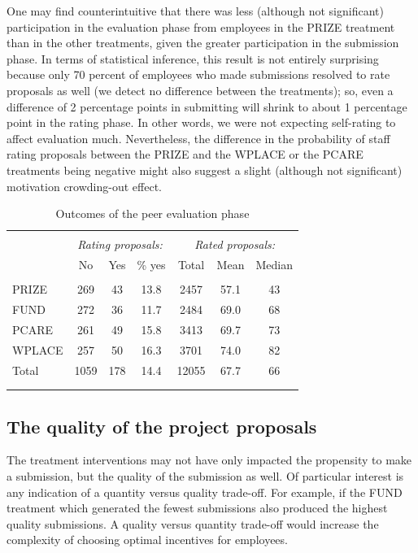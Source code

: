 \documentclass[11pt, titlepage]{article}
\begin{document}
One may find counterintuitive that there was less (although not
significant) participation in the evaluation phase from employees in the
PRIZE treatment than in the other treatments, given the greater
participation in the submission phase. In terms of statistical
inference, this result is not entirely surprising because only 70
percent of employees who made submissions resolved to rate proposals as
well (we detect no difference between the treatments); so, even a
difference of 2 percentage points in submitting will shrink to about 1
percentage point in the rating phase. In other words, we were not
expecting self-rating to affect evaluation much. Nevertheless, the
difference in the probability of staff rating proposals between the
PRIZE and the WPLACE or the PCARE treatments being negative might also
suggest a slight (although not significant) motivation crowding-out
effect.

\begin{table}
\centering
\caption{Outcomes of the peer evaluation phase}
\label{tab: ratings}
\begin{tabular}{@{}lcccccc}
  \\[-1.8ex]\hline \hline \\[-1.8ex]
 & \multicolumn{3}{c}{\emph{Rating proposals:}} &         \multicolumn{3}{c}{\emph{Rated proposals:}} \\
 \cmidrule(lr){2-4}\cmidrule(lr){5-7} & No & Yes & \% yes & Total & Mean & Median \\ 
  \hline \\[-1.86ex]
PRIZE & 269 & 43 & 13.8 & 2457 & 57.1 & 43 \\ 
  FUND & 272 & 36 & 11.7 & 2484 & 69.0 & 68 \\ 
  PCARE & 261 & 49 & 15.8 & 3413 & 69.7 & 73 \\ 
  WPLACE & 257 & 50 & 16.3 & 3701 & 74.0 & 82 \\ 
  [1.8ex] Total & 1059 & 178 & 14.4 & 12055 & 67.7 & 66 \\ 
   \\[-1.8ex]\hline \hline \\[-1.8ex]
\end{tabular}
\end{table}

\subsection{The quality of the project
proposals}\label{the-quality-of-the-project-proposals}

The treatment interventions may not have only impacted the propensity to
make a submission, but the quality of the submission as well. Of
particular interest is any indication of a quantity versus quality
trade-off. For example, if the FUND treatment which generated the fewest
submissions also produced the highest quality submissions. A quality
versus quantity trade-off would increase the complexity of choosing
optimal incentives for employees.
\end{document}
